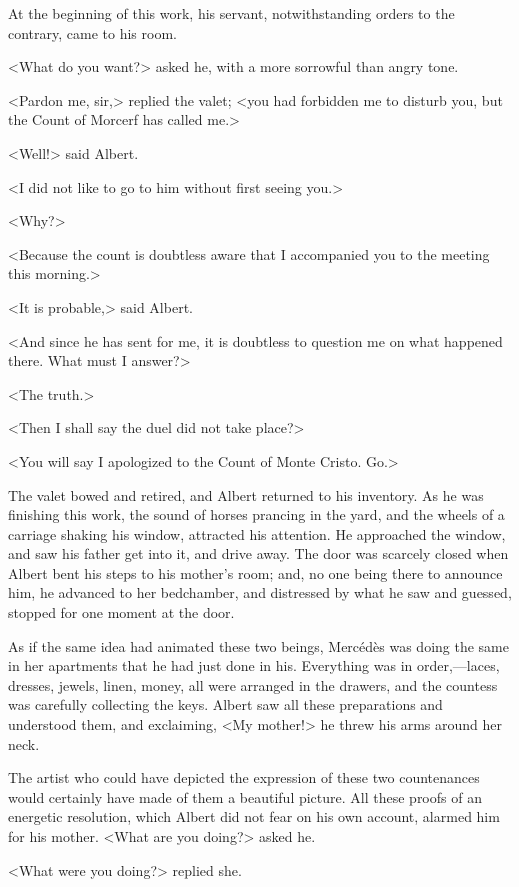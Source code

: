  At the beginning of this work, his servant, notwithstanding orders to the contrary, came to his room. 

 <What do you want?> asked he, with a more sorrowful than angry tone. 

 <Pardon me, sir,> replied the valet; <you had forbidden me to disturb you, but the Count of Morcerf has called me.> 

 <Well!> said Albert. 

 <I did not like to go to him without first seeing you.> 

 <Why?> 

 <Because the count is doubtless aware that I accompanied you to the meeting this morning.>

<It is probable,> said Albert. 

 <And since he has sent for me, it is doubtless to question me on what happened there. What must I answer?> 

 <The truth.> 

 <Then I shall say the duel did not take place?> 

 <You will say I apologized to the Count of Monte Cristo. Go.> 

 The valet bowed and retired, and Albert returned to his inventory. As he was finishing this work, the sound of horses prancing in the yard, and the wheels of a carriage shaking his window, attracted his attention. He approached the window, and saw his father get into it, and drive away. The door was scarcely closed when Albert bent his steps to his mother's room; and, no one being there to announce him, he advanced to her bedchamber, and distressed by what he saw and guessed, stopped for one moment at the door. 

 As if the same idea had animated these two beings, Mercédès was doing the same in her apartments that he had just done in his. Everything was in order,—laces, dresses, jewels, linen, money, all were arranged in the drawers, and the countess was carefully collecting the keys. Albert saw all these preparations and understood them, and exclaiming, <My mother!> he threw his arms around her neck. 

 The artist who could have depicted the expression of these two countenances would certainly have made of them a beautiful picture. All these proofs of an energetic resolution, which Albert did not fear on his own account, alarmed him for his mother. <What are you doing?> asked he. 

 <What were you doing?> replied she. 

